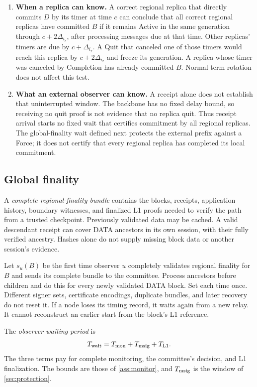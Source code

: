 \documentclass[11pt,a4paper]{article}
\newcommand{\Twait}{T_{\rm wait}}
\newcommand{\defterm}[1]{\textcolor{rrBlue}{\textit{#1}}}
\begin{document}
\begin{enumerate}[label=(\arabic*),itemsep=4pt]
\item \textbf{When a replica can know.} A correct regional replica
that directly commits $D$ by its timer at time $c$ can conclude that
all correct regional replicas have committed $B$ if it remains Active
in the same generation through $c+2\Delta_{i_r}$, after processing
messages due at that time. Other replicas' timers are due by
$c+\Delta_{i_r}$. A Quit that canceled one of those timers would reach
this replica by $c+2\Delta_{i_r}$ and freeze its generation. A replica
whose timer was canceled by Completion has already committed $B$.
Normal term rotation does not affect this test.

\item \textbf{What an external observer can know.} A receipt alone
does not establish that uninterrupted window. The backbone has no
fixed delay bound, so receiving no quit proof is not evidence that no
replica quit. Thus receipt arrival starts no fixed wait that certifies
commitment by all regional replicas. The global-finality wait defined
next protects the external prefix against a Force; it does not certify
that every regional replica has completed its local commitment.
\end{enumerate}

\subsection{Global finality}
\label{sec:global-finality}
A \defterm{complete regional-finality bundle} contains the blocks, receipts,
application history, boundary witnesses, and finalized L1 proofs needed
to verify the path from a trusted checkpoint. Previously validated data
may be cached. A valid descendant receipt can cover DATA ancestors in
its own session, with their fully verified ancestry. Hashes
alone do not supply missing block data or another session's evidence.

Let $s_u(B)$ be the first time observer $u$ completely validates regional
finality for $B$ and sends its complete bundle to the committee.
Process ancestors before children and do this for every newly
validated DATA block. Set each time once. Different signer sets,
certificate encodings, duplicate bundles, and later recovery do not reset
it. If a node loses its timing record, it waits again from a new relay.
It cannot reconstruct an earlier start from the block's L1 reference.

The \defterm{observer waiting period} is
\[
 \Twait=T_{\rm mon}+T_{\rm msig}+T_{\rm L1}.
\]
The three terms pay for complete monitoring, the committee's decision,
and L1 finalization. The bounds are those of \cref{ass:monitor}, and
$T_{\rm msig}$ is the window of \cref{sec:protection}.
\end{document}
